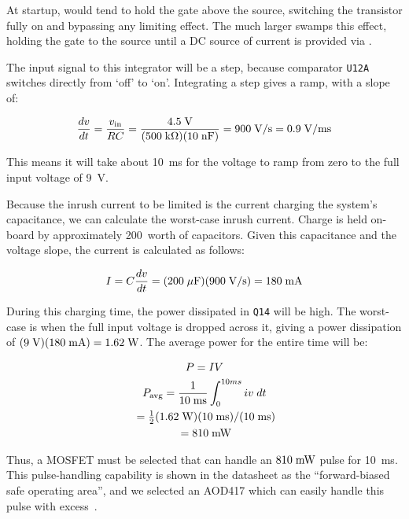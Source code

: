 At startup,  would tend to hold the gate above the source,
switching the transistor fully on and bypassing any limiting effect. The
much larger  swamps this effect, holding the gate to the
source until a DC source of current is provided via .

The input signal to this integrator will be a step, because comparator
\texttt{U12A} switches directly from `off' to `on'. Integrating a step gives
a ramp, with a slope of:

\begin{equation*}
    \frac{dv}{dt} = \frac{v_{\mathrm{in}}}{RC} = \frac{4.5\;\mathrm{V}}{(500\;\mathrm{k\Omega})(10\;\mathrm{nF})}
    = 900\;\mathrm{V/s} = 0.9\;\mathrm{V/ms}
\end{equation*}

This means it will take about 10~ms for the voltage to ramp from zero
to the full input voltage of 9~V.

Because the inrush current to be limited is the current charging the system's
capacitance, we can calculate the worst-case inrush current. Charge is held
on-board by approximately 200~\uF {}worth of capacitors. Given this
capacitance and the voltage slope, the current is calculated as follows:

\begin{equation*}
    I = C \frac{dv}{dt} = (200\;\mathrm{\mu F})(900\;\mathrm{V/s}) = 180\;\mathrm{mA}
\end{equation*}

During this charging time, the power dissipated in \texttt{Q14} will be high.
The worst-case is when the full input voltage is dropped across it, giving
a power dissipation of $(9\;\mathrm{V})(180\;\mathrm{mA}) = 1.62\;\mathrm{W}$. The average
power for the entire time will be:

\begin{gather*}
    P = IV \\
    P_{\mathrm{avg}} = \frac{1}{10\;\mathrm{ms}}\int_0^{10ms} iv\;dt \\
    {}= \tfrac{1}{2}(1.62\;\mathrm{W})(10\;\mathrm{ms})/(10\;\mathrm{ms}) \\
    {}= 810\;\mathrm{mW} \\
\end{gather*}

Thus, a MOSFET must be selected that can handle an $810\;\mathrm{mW}$ pulse for
10~ms. This pulse-handling capability is shown in the datasheet as
the ``forward-biased safe operating area'', and we selected an AOD417 which
can easily handle this pulse with excess~\cite{aod417}.

